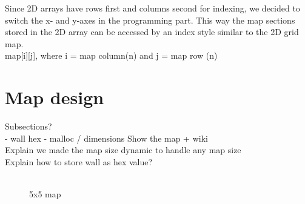 Since 2D arrays have rows first and columns second for indexing, we decided to switch the x- and y-axes in the programming part. This way the map sections stored in the 2D array can be accessed by an index style similar to the 2D grid map.
\\
map[i][j], where i = map column(n) and j = map row (n) 
\\



\section{Map design}
\label{sec:map_design} %
Subsections?\\
- wall hex
- malloc / dimensions
Show the map + wiki\\
Explain we made the map size dynamic to handle any map size\\
Explain how to store wall as hex value?\\
\\
\begin{figure}[htp]
    \centering
    \hspace{0.2\textwidth}
    \caption{5x5 map}
    \label{fig:5x5map}
\end{figure}

